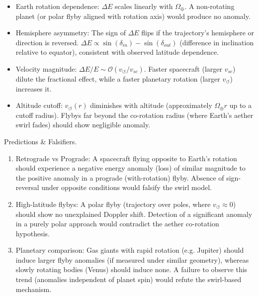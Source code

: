 \documentclass[11pt]{article}
\begin{document}
\begin{itemize}

\item 
Earth rotation dependence: $\Delta E$ scales linearly with $\Omega_{\oplus}$. A non-rotating planet (or polar flyby aligned with rotation axis) would produce no anomaly.




\item 
Hemisphere asymmetry: The sign of $\Delta E$ flips if the trajectory’s hemisphere or direction is reversed. $\Delta E \propto \sin(\delta_{in}) - \sin(\delta_{out})$ (difference in inclination relative to equator), consistent with observed latitude dependence.




\item 
Velocity magnitude: $\Delta E/E \sim \mathcal{O}(v_{\circlearrowleft}/v_{sc})$. Faster spacecraft (larger $v_{sc}$) dilute the fractional effect, while a faster planetary rotation (larger $v_{\circlearrowleft}$) increases it.




\item 
Altitude cutoff: $v_{\circlearrowleft}(r)$ diminishes with altitude (approximately $\Omega_{\oplus} r$ up to a cutoff radius). Flybys far beyond the co-rotation radius (where Earth’s aether swirl fades) should show negligible anomaly.




\end{itemize}

Predictions \& Falsifiers.


\begin{enumerate}

\item 
Retrograde vs Prograde: A spacecraft flying opposite to Earth’s rotation should experience a negative energy anomaly (loss) of similar magnitude to the positive anomaly in a prograde (with-rotation) flyby. Absence of sign-reversal under opposite conditions would falsify the swirl model.




\item 
High-latitude flybys: A polar flyby (trajectory over poles, where $v_{\circlearrowleft}\approx0$) should show no unexplained Doppler shift. Detection of a significant anomaly in a purely polar approach would contradict the aether co-rotation hypothesis.




\item 
Planetary comparison: Gas giants with rapid rotation (e.g. Jupiter) should induce larger flyby anomalies (if measured under similar geometry), whereas slowly rotating bodies (Venus) should induce none. A failure to observe this trend (anomalies independent of planet spin) would refute the swirl-based mechanism.




\end{enumerate}
\end{document}
